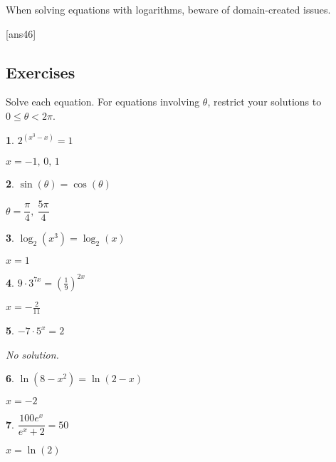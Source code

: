 \documentclass{amsbook}
\newtheorem{exc}{}
\newenvironment{ex}{\begin{exc}\normalfont}{\end{exc}}
\numberwithin{section}{chapter}
\numberwithin{equation}{chapter}
\begin{document}
When solving equations with logarithms, beware of domain-created issues.

[ans46]
\subsection*{Exercises \nopunct} \hfill

Solve each equation. For equations involving $\theta$, restrict your solutions to $0 \leq \theta < 2\pi$.

\begin{multicols}{2}

\begin{ex}
	$2^{(x^{3} - x)} = 1$ 
	\begin{sol}
		$x = -1, \, 0, \, 1$
	\end{sol}
\end{ex}

\begin{ex}
	$\sin(\theta) = \cos(\theta)$
	\begin{sol}
		$\theta = \dfrac{\pi}{4},\ \dfrac{5\pi}{4}$
	\end{sol}
\end{ex}

\begin{ex}
	$\log_{2}\left(x^{3}\right) = \log_{2}(x)$
	\begin{sol}
		$x = 1$
	\end{sol}
\end{ex}

\begin{ex}
	 $9 \cdot 3^{7x} = \left(\frac{1}{9}\right)^{2x}$ 
	\begin{sol}
		$x=-\frac{2}{11}$
	\end{sol}
\end{ex}


\begin{ex}
	$-7\cdot 5^{x} = 2$  
	\begin{sol}
		No solution.
	\end{sol}
\end{ex}


\begin{ex}
	$\ln\left(8-x^2\right)=\ln(2-x)$
	\begin{sol}
		 $x=-2$
	\end{sol}
\end{ex}

\begin{ex}
	 $\dfrac{100e^{x}}{e^{x}+2}=50$ 
	\begin{sol}
		$x =  \ln(2)$
	\end{sol}
\end{ex}



\end{multicols}
\end{document}

